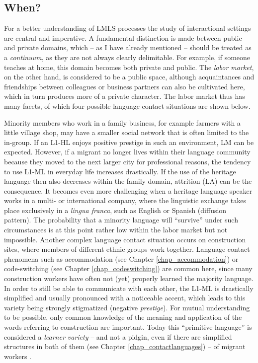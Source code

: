 \documentclass[output=paper]{langscibook}
\begin{document}
\subsection{When?}
\label{subsec:when}

For a better understanding of LMLS processes the study of interactional settings are central and imperative. A fundamental distinction is made between public and private domains, which -- as I have already mentioned -- should be treated as a \emph{continuum}, as they are not always clearly delimitable. For example, if someone teaches at home, this domain becomes both private and public. The \emph{labor market}, on the other hand, is considered to be a public space, although acquaintances and friendships between colleagues or business partners can also be cultivated here, which in turn produces more of a private character. The labor market thus has many facets, of which four possible language contact situations are shown below.

Minority members who work in a family business, for example farmers with a little village shop, may have a smaller social network that is often limited to the in-group. If an L1-HL enjoys positive prestige in such an environment, LM can be expected. However, if a migrant no longer lives within their language community because they moved to the next larger city for professional reasons, the tendency to use L1-ML in everyday life increases drastically. If the use of the heritage language then also decreases within the family domain, attrition (LA) can be the consequence. It becomes even more challenging when a heritage language speaker works in a multi- or international company, where the linguistic exchange takes place exclusively in a \emph{lingua franca}, such as English or Spanish (diffusion pattern). The probability that a minority language will ``survive'' under such circumstances is at this point rather low within the labor market but not impossible. Another complex language contact situation occurs on construction sites, where members of different ethnic groups work together. Language contact phenomena such as accommodation (see Chapter \ref{chap_accommodation}) or code-switching (see Chapter \ref{chap_codeswitching}) are common here, since many construction workers have often not (yet) properly learned the majority language. In order to still be able to communicate with each other, the L1-ML is drastically simplified and usually pronounced with a noticeable accent, which leads to this variety being strongly stigmatized (negative \emph{prestige}). For mutual understanding to be possible, only common knowledge of the meaning and application of the words referring to construction are important. Today this ``primitive language'' is considered a \emph{learner variety} -- and not a pidgin, even if there are simplified structures in both of them (see Chapter \ref{chap_contactlanguages}) -- of migrant workers \parencite[129--135]{Riehl2014}.
\end{document}
